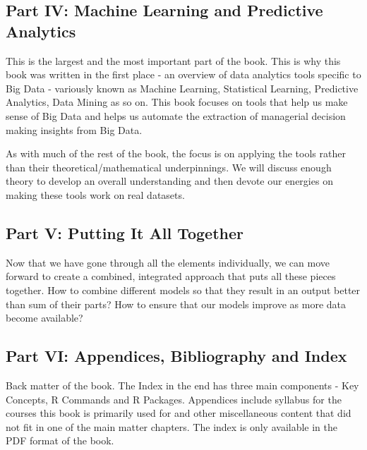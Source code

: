 \documentclass[
]{krantz}
\begin{document}
\hypertarget{part-iv-machine-learning-and-predictive-analytics}{%
\subsection*{Part IV: Machine Learning and Predictive Analytics}\label{part-iv-machine-learning-and-predictive-analytics}}


This is the largest and the most important part of the book. This is why this book was written in the first place - an overview of data analytics tools specific to Big Data - variously known as Machine Learning, Statistical Learning, Predictive Analytics, Data Mining as so on. This book focuses on tools that help us make sense of Big Data and helps us automate the extraction of managerial decision making insights from Big Data.

As with much of the rest of the book, the focus is on applying the tools rather than their theoretical/mathematical underpinnings. We will discuss enough theory to develop an overall understanding and then devote our energies on making these tools work on real datasets.

\hypertarget{part-v-putting-it-all-together}{%
\subsection*{Part V: Putting It All Together}\label{part-v-putting-it-all-together}}


Now that we have gone through all the elements individually, we can move forward to create a combined, integrated approach that puts all these pieces together. How to combine different models so that they result in an output better than sum of their parts? How to ensure that our models improve as more data become available?

\hypertarget{part-vi-appendices-bibliography-and-index}{%
\subsection*{Part VI: Appendices, Bibliography and Index}\label{part-vi-appendices-bibliography-and-index}}


Back matter of the book. The Index in the end has three main components - Key Concepts, R Commands and R Packages. Appendices include syllabus for the courses this book is primarily used for and other miscellaneous content that did not fit in one of the main matter chapters. The index is only available in the PDF format of the book.
\end{document}
